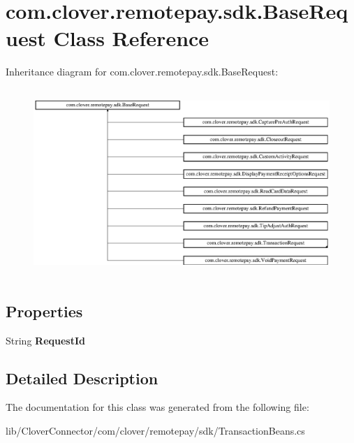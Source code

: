 \hypertarget{classcom_1_1clover_1_1remotepay_1_1sdk_1_1_base_request}{}\section{com.\+clover.\+remotepay.\+sdk.\+Base\+Request Class Reference}
\label{classcom_1_1clover_1_1remotepay_1_1sdk_1_1_base_request}


 


Inheritance diagram for com.\+clover.\+remotepay.\+sdk.\+Base\+Request\+:\begin{figure}[H]
\begin{center}
\leavevmode
\includegraphics[height=7.142857cm]{classcom_1_1clover_1_1remotepay_1_1sdk_1_1_base_request}
\end{center}
\end{figure}
\subsection*{Properties}
\begin{DoxyCompactItemize}
\item 
\mbox{\label{classcom_1_1clover_1_1remotepay_1_1sdk_1_1_base_request_add83c9b598bb03c5caa8daf80b7c80a6}} 
String {\bfseries Request\+Id}
\end{DoxyCompactItemize}


\subsection{Detailed Description}




The documentation for this class was generated from the following file\+:\begin{DoxyCompactItemize}
\item 
lib/\+Clover\+Connector/com/clover/remotepay/sdk/Transaction\+Beans.\+cs\end{DoxyCompactItemize}
